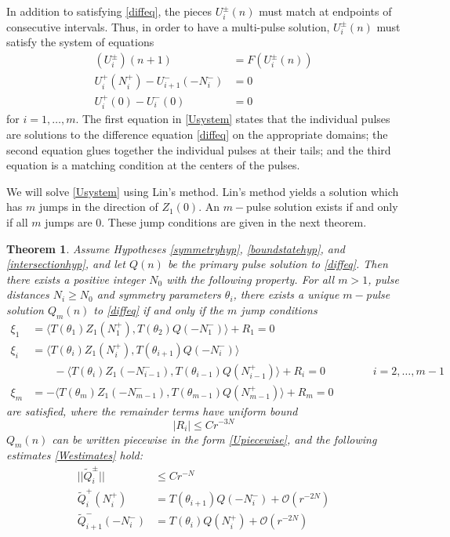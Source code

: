 \documentclass[12pt]{elsarticle}
\newtheorem{theorem}{Theorem}
\begin{document}
In addition to satisfying \eqref{diffeq}, the pieces $U_i^\pm(n)$ must match at endpoints of consecutive intervals. Thus, in order to have a multi-pulse solution, $U_i^\pm(n)$ must satisfy the system of equations
\begin{equation}\label{Usystem}
\begin{aligned}
(U_i^\pm)(n+1) &= F(U_i^\pm(n))  \\
U_i^+(N_i^+) - U_{i+1}^-(-N_i^-) &= 0 \\
U_i^+(0) - U_i^-(0) &= 0
\end{aligned}
\end{equation}
for $i = 1, \dots, m$. The first equation in \eqref{Usystem} states that the individual pulses are solutions to the difference equation \eqref{diffeq} on the appropriate domains; the second equation glues together the individual pulses at their tails; and the third equation is a matching condition at the centers of the pulses.

We will solve \eqref{Usystem} using Lin's method. Lin's method yields a solution which has $m$ jumps in the direction of $Z_1(0)$. An $m-$pulse solution exists if and only if all $m$ jumps are 0. These jump conditions are given in the next theorem.

\begin{theorem}\label{ntmulti}
Assume Hypotheses \ref{symmetryhyp}, \ref{boundstatehyp}, and \ref{intersectionhyp}, and let $Q(n)$ be the primary pulse solution to \eqref{diffeq}. Then there exists a positive  integer $N_0$ with the following property. For all $m > 1$, pulse distances $N_i \geq N_0$ and symmetry parameters $\theta_i$, there exists a unique $m-$pulse solution $Q_m(n)$ to \eqref{diffeq} if and only if the $m$ jump conditions 
\begin{equation}\label{jumpcondexist}
\begin{aligned}
\xi_1 &= \langle T(\theta_1) Z_1(N_1^+), T(\theta_{2}) Q(-N_1^-) \rangle + R_1 = 0 \\
\xi_i &= \langle T(\theta_i) Z_1(N_i^+), T(\theta_{i+1}) Q(-N_i^-) \rangle \\
&\qquad-\langle T(\theta_i) Z_1(-N_{i-1}^-), T(\theta_{i-1}) Q(N_{i-1}^+) \rangle + R_i = 0 && \qquad i = 2, \dots, m-1 \\
\xi_m &= -\langle T(\theta_m) Z_1(-N_{m-1}^-), T(\theta_{m-1}) Q(N_{m-1}^+) \rangle + R_m = 0
\end{aligned}
\end{equation}
are satisfied, where the remainder terms have uniform bound
\[
|R_i| \leq C r^{-3N}
\]
$Q_m(n)$ can be written piecewise in the form \eqref{Upiecewise}, and the following estimates \eqref{Westimates} hold:
\begin{equation}\label{Westimates}
\begin{aligned}
||\tilde{Q}_i^\pm|| &\leq C r^{-N} \\
\tilde{Q}_i^+(N_i^+) &= T(\theta_{i+1}) Q(-N_i^-) + \mathcal{O}(r^{-2N}) \\
\tilde{Q}_{i+1}^-(-N_i^-) &= T(\theta_i) Q(N_i^+) + \mathcal{O}(r^{-2N})
\end{aligned}
\end{equation}
\end{theorem}
\end{document}
